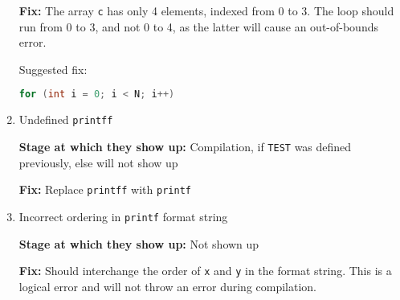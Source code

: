 \begin{enumerate}
          \textbf{Fix:}
          The array \texttt{c} has only 4 elements, indexed from 0 to 3.
          The loop should run from 0 to 3, and not 0 to 4, as the latter will cause an out-of-bounds error.

          Suggested fix:
          \begin{lstlisting}[language=C, frame=single]
for (int i = 0; i < N; i++)
            \end{lstlisting}

    \item Undefined \texttt{printff}

          \textbf{Stage at which they show up:}
          Compilation, if \texttt{TEST} was defined previously, else will not show up

          \textbf{Fix:}
          Replace \texttt{printff} with \texttt{printf}

    \item Incorrect ordering in \texttt{printf} format string

          \textbf{Stage at which they show up:}
          Not shown up

          \textbf{Fix:}
          Should interchange the order of \texttt{x} and \texttt{y} in the format string.
          This is a logical error and will not throw an error during compilation.

\end{enumerate}

